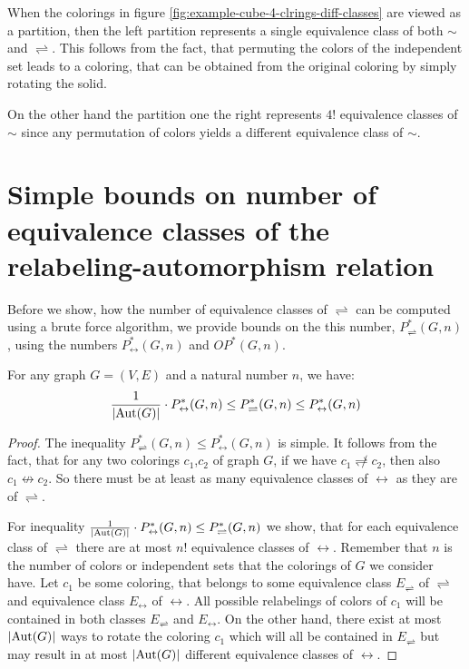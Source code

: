 \begin{highlight}
When the colorings in figure \ref{fig:example-cube-4-clrings-diff-classes} are viewed as a partition, then the left partition represents a single equivalence class of both $\sim$ and $\rightleftharpoons$. This follows from the fact, that permuting the colors of the independent set leads to a coloring, that can be obtained from the original coloring by simply rotating the solid.

On the other hand the partition one the right represents $4!$ equivalence classes of $\sim$ since any permutation of colors yields a different equivalence class of $\sim$.

\section{Simple bounds on number of equivalence classes of the relabeling-automorphism relation}

Before we show, how the number of equivalence classes of $\rightleftharpoons$ can be computed using a brute force algorithm, we provide bounds on the this number, $P^*_\rightleftharpoons(G,n)$, using the numbers $P^*_\leftrightarrow(G,n)$ and $OP^*(G,n)$.

\begin{claim}\label{clm:relabeling-bound}
    For any graph $G=(V,E)$ and a natural number $n$, we have: $$\frac{1}{\left|{\operatorname{Aut}(G)}\right|} \cdot P^*_\leftrightarrow(G,n) \leq P^*_\rightleftharpoons(G,n) \leq P^*_\leftrightarrow(G,n)$$ 
\end{claim}

\begin{proof}

The inequality $P^*_\rightleftharpoons(G,n) \leq P^*_\leftrightarrow(G,n)$ is simple. It follows from the fact, that for any two colorings $c_1$,$c_2$ of graph $G$, if we have $c_1 \not\rightleftharpoons c_2$, then also $c_1 \not\leftrightarrow c_2$. So there must be at least as many equivalence classes of $\leftrightarrow$ as they are of $\rightleftharpoons$.

For inequality $\frac{1}{\left|{\operatorname{Aut}(G)}\right|} \cdot P^*_\leftrightarrow(G,n) \leq P^*_\rightleftharpoons(G,n)$ we show, that for each equivalence class of $\rightleftharpoons$ there are at most $n!$ equivalence classes of $\leftrightarrow$. Remember that $n$ is the number of colors or independent sets that the colorings of $G$ we consider have. Let $c_1$ be some coloring, that belongs to some equivalence class $E_\rightleftharpoons$ of $\rightleftharpoons$ and equivalence class $E_\leftrightarrow$ of $\leftrightarrow$. All possible relabelings of colors of $c_1$ will be contained in both classes $E_\rightleftharpoons$ and $E_\leftrightarrow$. On the other hand, there exist at most $\left|{\operatorname{Aut}(G)}\right|$ ways to rotate the coloring $c_1$ which will all be contained in $E_\rightleftharpoons$ but may result in at most $\left|{\operatorname{Aut}(G)}\right|$ different equivalence classes of $\leftrightarrow$.


\end{proof}
\end{highlight}
